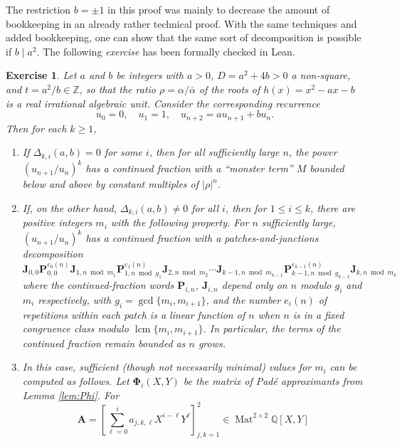 \documentclass{article}
\numberwithin{equation}{section}
\newtheorem{exer}[thm]{Exercise}
\theoremstyle{definition}
\theoremstyle{remark}
\DeclareMathOperator{\lcm}{lcm}
\DeclareMathOperator{\Mat}{Mat}
\newcommand{\QQ}{\mathbb{Q}}
\newcommand{\ZZ}{\mathbb{Z}}
\newcommand{\<}{\left\langle}
\renewcommand{\>}{\right\rangle}
\begin{document}
The restriction $b = \pm 1$ in this proof was mainly to decrease the amount of bookkeeping in an already rather technical proof. With the same techniques and added bookkeeping, one can show that the same sort of decomposition is possible if $b \mid a^2$. The following \emph{exercise} has been formally checked in Lean.
\begin{exer}\label{exer:main_gen}
  Let $a$ and $b$ be integers with $a > 0$, $D = a^2 + 4 b > 0$ a non-square, and $t = a^2/b \in \ZZ$, so that the ratio $\rho = \alpha/\bar\alpha$ of the roots of $h(x) = x^2 - a x - b$ is a real irrational algebraic unit. Consider the corresponding recurrence
  \begin{equation*}
    u_0 = 0, \quad u_1 = 1, \quad u_{n+2} = a u_{n+1} + b u_n.
  \end{equation*}
  Then for each $k \geq 1$,
  \begin{enumerate}[label=\textup{(\alph*)}]
    \item If $\Delta_{k,i}(a,b) = 0$ for some $i$, then for all sufficiently large $n$, the power $(u_{n+1}/u_n)^k$ has a continued fraction with a ``monster term\kern-1pt'' $M$ bounded below and above by constant multiples of $|\rho|^n$.
    \item If, on the other hand, $\Delta_{k,i}(a,b) \neq 0$ for all $i$, then for $1 \leq i \leq k$, there are positive integers $m_i$ with the following property. For $n$ sufficiently large, $(u_{n+1}/u_n)^k$ has a continued fraction with a patches-and-junctions decomposition
    \begin{equation*}
      \mathbf{J}_{0,0} \mathbf{P}_{0,0}^{e_0(n)} \mathbf{J}_{1, n \bmod m_1} \mathbf{P}_{1, n \bmod g_1}^{e_1(n)} \mathbf{J}_{2, n \bmod m_2} \cdots \mathbf{J}_{k-1, n \bmod m_{k-1}} \mathbf{P}_{k-1, n \bmod g_{k-1}}^{e_{k-1}(n)} \mathbf{J}_{k, n \bmod m_k}
    \end{equation*}
    where the continued-fraction words $\mathbf{P}_{i,n}$, $\mathbf{J}_{i,n}$ depend only on $n$ modulo $g_i$ and $m_i$ respectively, with $g_i = \gcd\{m_i,m_{i+1}\}$, and the number $e_i(n)$ of repetitions within each patch is a linear function of $n$ when $n$ is in a fixed congruence class modulo $\lcm\{m_i, m_{i+1}\}$. In particular, the terms of the continued fraction remain bounded as $n$ grows.
    \item In this case, sufficient (though not necessarily minimal) values for $m_i$ can be computed as follows. Let $\boldsymbol{\Phi}_i(X,Y)$ be the matrix of Pad\'e approximants from Lemma \ref{lem:Phi}. For
    \[
      \mathbf{A} = \left[\sum_{\ell=0}^i a_{j,k,\ell} X^{i-\ell} Y^\ell \right]_{j,k=1}^2 \in \Mat^{2\times2} \QQ[X,Y]
\]
\end{enumerate}
\end{exer}
\end{document}
